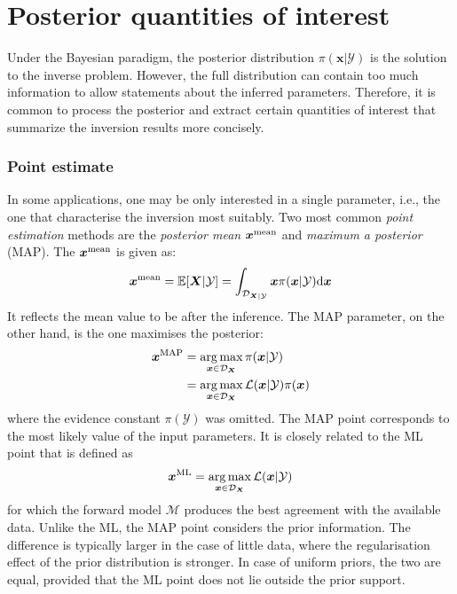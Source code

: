 \section{Posterior quantities of interest}
Under the Bayesian paradigm, the posterior distribution $\pi(\boldsymbol{x}|\mathcal{Y})$ is the solution to the inverse problem. However, the full distribution can contain too much information to allow statements about the inferred parameters. Therefore, it is common to process the posterior and extract certain quantities of interest that summarize the inversion results more concisely.

\subsubsection{Point estimate}

In some applications, one may be only interested in a single parameter, i.e., the one that characterise the inversion most suitably. Two most common \textit{point estimation} methods are the \textit{posterior mean} $\boldsymbol{x}^{\rm{mean}}$ and \textit{maximum a posterior} (\acrshort{MAP}). The $\boldsymbol{x}^{\rm{mean}}$ is given as:
\begin{equation}
    \label{eq: posterior mean}
    \boldsymbol{x}^{\rm{mean}} = \mathbb{E}[\boldsymbol{X}|\mathcal{Y}] = \int_{\mathcal{D}_{\boldsymbol{X}|\mathcal{Y}}} 
    \boldsymbol{x} \pi(\boldsymbol{x}|\mathcal{Y}) {\rm{d}} \boldsymbol{x}  
\end{equation}
It reflects the mean value to be after the inference. The \acrshort{MAP} parameter, on the other hand, is the one maximises the posterior:
\begin{equation}
    \label{eq: MAP}
    \begin{aligned}
       \boldsymbol{x}^{\rm{MAP}} &= \mathop{\arg\max}\limits_{\boldsymbol{x} \in \mathcal{D}_{\boldsymbol{X}}}
    \pi(\boldsymbol{x}|\mathcal{Y}) \\
    &=\mathop{\arg\max}\limits_{\boldsymbol{x} \in \mathcal{D}_{\boldsymbol{X}}}
   {\mathcal{L}(\boldsymbol{x}|\mathcal{Y}) \pi(\boldsymbol{x})}     
    \end{aligned}
\end{equation}
where the evidence constant $\pi(\mathcal{Y})$ was omitted. The \acrshort{MAP} point corresponds to the most likely value of the input parameters. It is closely related to the \acrfull{ML} point that is defined as 
\begin{equation}
    \label{eq: MLE}
    \boldsymbol{x}^{\rm{ML}}  = \mathop{\arg\max}\limits_{\boldsymbol{x} \in \mathcal{D}_{\boldsymbol{X}}}
   {\mathcal{L}(\boldsymbol{x}|\mathcal{Y})}
\end{equation}
for which the forward model $\mathcal{M}$ produces the best agreement with the available data. Unlike the \acrshort{ML}, the \acrshort{MAP} point considers the prior information. The difference is typically larger in the case of little data, where the regularisation effect of the prior distribution is stronger. In case of uniform priors, the two are equal, provided that the \acrshort{ML} point does not lie outside the prior support.

